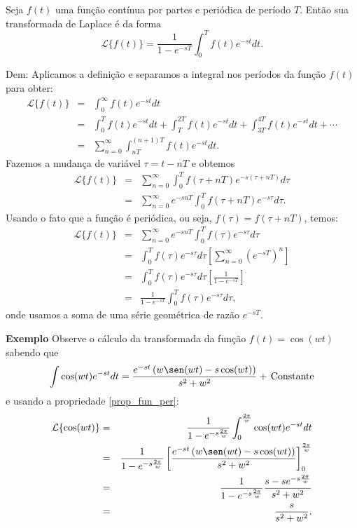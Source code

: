 \documentclass[a4paper,10pt]{book}
\begin{document}
 Seja $f(t)$ uma função contínua por partes e periódica de período $T$. Então sua transformada de Laplace é da forma
\begin{equation}
\mathcal{L}\{f(t)\}=\frac{1}{1-e^{-sT}}\int_0^Tf(t)e^{-st}dt.
\end{equation}


Dem: Aplicamos a definição e separamos a integral nos períodos da função $f(t)$ para obter:
\begin{eqnarray*}
 \mathcal{L}\{f(t)\}&=&\int_0^\infty f(t)e^{-st}dt \\
 &=&\int_0^T f(t)e^{-st}dt+\int_T^{2T} f(t)e^{-st}dt+\int_{3T}^{4T} f(t)e^{-st}dt+\cdots\\
 &=&\sum_{n=0}^\infty \int_{nT}^{(n+1)T} f(t)e^{-st}dt.
\end{eqnarray*}
Fazemos a mudança de variável $\tau=t-nT$ e obtemos
 \begin{eqnarray*}
 \mathcal{L}\{f(t)\}&=&\sum_{n=0}^\infty \int_{0}^{T} f(\tau+nT)e^{-s(\tau+nT)}d\tau\\
 &=&\sum_{n=0}^\infty e^{-snT} \int_{0}^{T} f(\tau+nT)e^{-s\tau}d\tau.
 \end{eqnarray*}
 Usando o fato que a função é periódica, ou seja, $f(\tau)=f(\tau+nT)$, temos:
 \begin{eqnarray*}
  \mathcal{L}\{f(t)\}&=&\sum_{n=0}^\infty e^{-snT} \int_{0}^{T} f(\tau)e^{-s\tau}d\tau\\
 &=&\int_{0}^{T} f(\tau)e^{-s\tau}d\tau\left[\sum_{n=0}^\infty \left(e^{-sT}\right)^n \right]\\
 &=&\int_{0}^{T} f(\tau)e^{-s\tau}d\tau\left[\frac{1}{1-e^{-sT}} \right]\\
 &=&\frac{1}{1-e^{-sT}}\int_{0}^{T} f(\tau)e^{-s\tau}d\tau,
\end{eqnarray*}
onde usamos a soma de uma série geométrica de razão $e^{-sT}$.
 
 
{\bf Exemplo} Observe o cálculo da transformada da função $f(t)=\cos(wt)$ sabendo que
\begin{equation}
\int \cos(wt)e^{-st}dt=\frac{e^{-st}\left(w\sen(wt)-s\cos(wt)\right)}{s^2+w^2}+\ \!\hbox{Constante}
\end{equation}
e usando a propriedade \ref{prop_fun_per}:
\begin{eqnarray*} 
\mathcal{L}\{\cos(wt)\}&=&\frac{1}{1-e^{-s\frac{2\pi }{w}}}\int_0^{\frac{2\pi }{w}}\cos(wt)e^{-st}dt\\
&=&\frac{1}{1-e^{-s\frac{2\pi }{w}}}\left[\frac{e^{-st}\left(w\sen(wt)-s\cos(wt)\right)}{s^2+w^2}\right]_0^{\frac{2\pi }{w}}\\
&=&\frac{1}{1-e^{-s\frac{2\pi }{w}}}\frac{s-se^{-s\frac{2\pi }{w}}}{s^2+w^2}\\
&=&\frac{s}{s^2+w^2}.
\end{eqnarray*}
\end{document}
